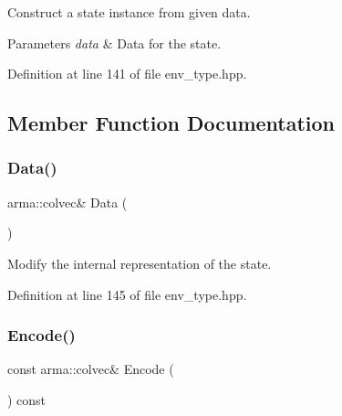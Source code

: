 Construct a state instance from given data. 


\begin{DoxyParams}{Parameters}
{\em data} & Data for the state. \\
\hline
\end{DoxyParams}


Definition at line 141 of file env\+\_\+type.\+hpp.



\subsection{Member Function Documentation}
\mbox{\label{classmlpack_1_1rl_1_1ContinuousActionEnv_1_1State_ad6a50c7b5fced2e931d9a4b4ff989ed6}} 
\subsubsection{Data()}
{\footnotesize\ttfamily arma\+::colvec\& Data (\begin{DoxyParamCaption}{ }\end{DoxyParamCaption})\hspace{0.3cm}{\ttfamily [inline]}}



Modify the internal representation of the state. 



Definition at line 145 of file env\+\_\+type.\+hpp.

\mbox{\label{classmlpack_1_1rl_1_1ContinuousActionEnv_1_1State_a8c1a320788b55fad936455caf0acb62a}} 
\subsubsection{Encode()}
{\footnotesize\ttfamily const arma\+::colvec\& Encode (\begin{DoxyParamCaption}{ }\end{DoxyParamCaption}) const\hspace{0.3cm}{\ttfamily [inline]}}



